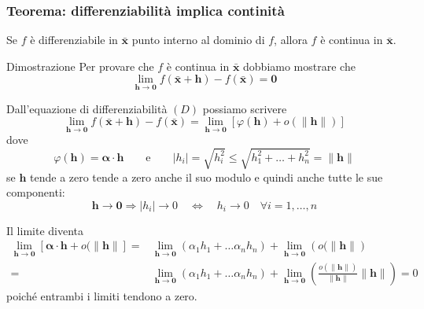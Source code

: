 \documentclass[x11names]{article}
\begin{document}
	\begin{center}
		\colorbox{myred}{\begin{minipage}{5.75in}
				\begin{redes}{}
					\subsubsection{Teorema: differenziabilità implica continità}
					Se \(f\) è differenziabile in \(\boldsymbol{\bar{x}}\) punto interno al dominio di \(f\), allora \(f\) è continua in \(\boldsymbol{\bar{x}}\).
				\end{redes}
		\end{minipage}}        
	\end{center}
	\begin{es}{Dimostrazione}
		Per provare che \(f\) è continua in \(\boldsymbol{\bar{x}}\) dobbiamo mostrare che
		\[ 
		\lim_{\boldsymbol{h}\to \boldsymbol{0}} f(\boldsymbol{\bar{x}} + \boldsymbol{h}) - f(\boldsymbol{\bar{x}}) = \boldsymbol{0}
		\]
		
		Dall'equazione di differenziabilità \((D)\) possiamo scrivere
		\[ 
		\lim_{\boldsymbol{h}\to \boldsymbol{0}} f(\boldsymbol{\bar{x}} + \boldsymbol{h}) - f(\boldsymbol{\bar{x}}) = \lim_{\boldsymbol{h}\to \boldsymbol{0}} \left[\varphi (\boldsymbol{h}) + o(\|\boldsymbol{h}\|)\right]
		\]
		dove
		\[ 
		\varphi(\boldsymbol{h}) = \boldsymbol{\alpha}\cdot \boldsymbol{h} \qquad \text{e} \qquad |h_{i}| =\sqrt{h_{i}^2} \leq \sqrt{h_{1}^2 + \dots + h_{n}^2} = \|\boldsymbol{h}\|
		\]
		se \(\boldsymbol{h}\) tende a zero tende a zero anche il suo modulo e quindi anche tutte le sue componenti:
		\[ 
		\boldsymbol{h} \to \boldsymbol{0} \Longrightarrow |h_i| \to 0 \quad \Longleftrightarrow \quad h_i \to 0 \quad \forall i = 1,\dots,n
		\]
		
		Il limite diventa
		\begin{align*}
			\lim_{\boldsymbol{h}\to \boldsymbol{0}} \left[\boldsymbol{\alpha}\cdot \boldsymbol{h} + o(\|\boldsymbol{h}\|\right] =& \lim_{\boldsymbol{h}\to \boldsymbol{0}} \left(\alpha_1 h_1 +\dots\alpha_n h_n\right) + \lim_{\boldsymbol{h}\to \boldsymbol{0}} \left(o(\|\boldsymbol{h}\|\right) \\
			=&\lim_{\boldsymbol{h}\to \boldsymbol{0}} \left(\alpha_1 h_1 +\dots\alpha_n h_n\right) + \lim_{\boldsymbol{h}\to \boldsymbol{0}} \left(\frac{o(\|\boldsymbol{h}\|)}{\|\boldsymbol{h}\|}\|\boldsymbol{h}\|\right) = 0
		\end{align*}
		poiché entrambi i limiti tendono a zero.
	\end{es}
	
\end{document}

